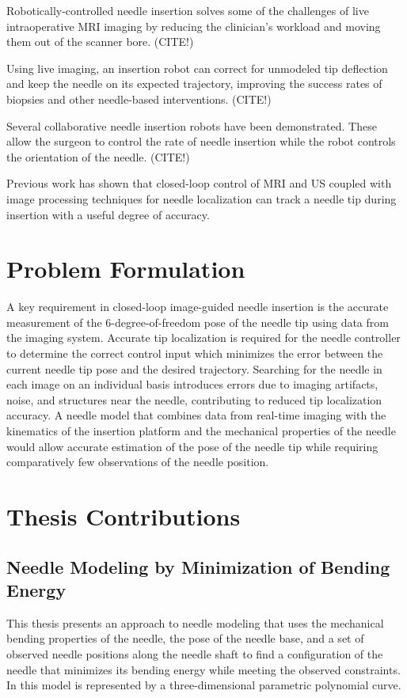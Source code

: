 Robotically-controlled needle insertion solves some of the challenges of live intraoperative MRI imaging by reducing the clinician's workload and moving them out of the scanner bore. (CITE!)

Using live imaging, an insertion robot can correct for unmodeled tip deflection and keep the needle on its expected trajectory, improving the success rates of biopsies and other needle-based interventions. (CITE!)

Several collaborative needle insertion robots have been demonstrated. These allow the surgeon to control the rate of needle insertion while the robot controls the orientation of the needle. (CITE!)

Previous work has shown that closed-loop control of MRI\cite{patel_closed-loop_2015} and US\cite{vrooijink_needle_2014} coupled with image processing techniques for needle localization can track a needle tip during insertion with a useful degree of accuracy.

\section{Problem Formulation}
\label{sec:problem_formulation}
A key requirement in closed-loop image-guided needle insertion is the accurate measurement of the 6-degree-of-freedom pose of the needle tip using data from the imaging system. Accurate tip localization is required for the needle controller to determine the correct control input which minimizes the error between the current needle tip pose and the desired trajectory. Searching for the needle in each image on an individual basis introduces errors due to imaging artifacts, noise, and structures near the needle, contributing to reduced tip localization accuracy. A needle model that combines data from real-time imaging with the kinematics of the insertion platform and the mechanical properties of the needle would allow accurate estimation of the pose of the needle tip while requiring comparatively few observations of the needle position.


\section{Thesis Contributions}

\subsection{Needle Modeling by Minimization of Bending Energy}
This thesis presents an approach to needle modeling that uses the mechanical bending properties of the needle, the pose of the needle base, and a set of observed needle positions along the needle shaft to find a configuration of the needle that minimizes its bending energy while meeting the observed constraints. In this model is represented by a three-dimensional parametric polynomial curve. 

